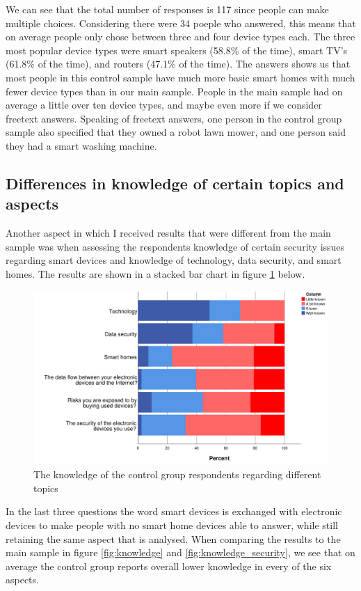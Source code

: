 We can see that the total number of responses is 117 since people can make multiple choices. Considering there were 34 poeple who answered, this means that on average people only chose between three and four device types each. The three most popular device types were smart speakers (58.8\% of the time), smart TV's (61.8\% of the time), and routers (47.1\% of the time). The answers shows us that most people in this control sample have much more basic smart homes with much fewer device types than in our main sample. People in the main sample had on average a little over ten device types, and maybe even more if we consider freetext answers. Speaking of freetext answers, one person in the control group sample also specified that they owned a robot lawn mower, and one person said they had a smart washing machine. 

\subsection{Differences in knowledge of certain topics and aspects}
Another aspect in which I received results that were different from the main sample was when assessing the respondents knowledge of certain security issues regarding smart devices and knowledge of technology, data security, and smart homes. The results are shown in a stacked bar chart in figure \ref{fig:controlgroup_knowledge} below. 
\begin{figure}[!h]
    \centering
    \includegraphics[scale=0.55]{figures/diagrams/controlgroup_knowledge.pdf}
    \caption{The knowledge of the control group respondents regarding different topics}
    \label{fig:controlgroup_knowledge}
\end{figure}
In the last three questions the word smart devices is exchanged with electronic devices to make people with no smart home devices able to answer, while still retaining the same aspect that is analysed. When comparing the results to the main sample in figure \ref{fig:knowledge} and \ref{fig:knowledge_security}, we see that on average the control group reports overall lower knowledge in every of the six aspects. 
